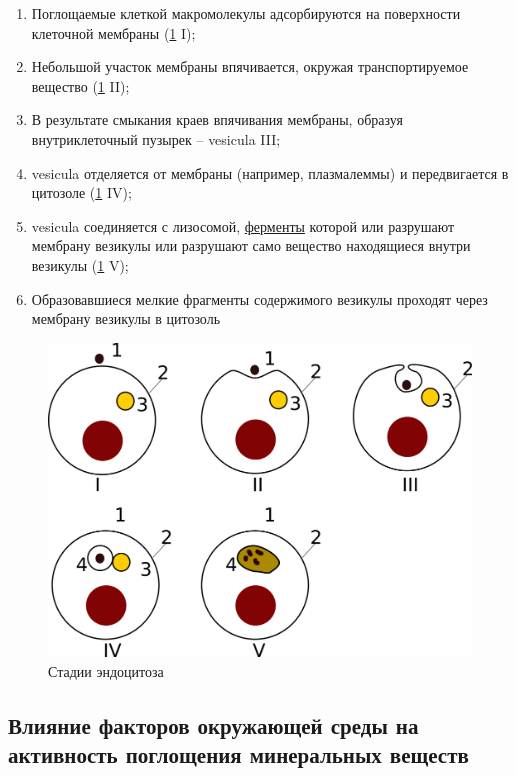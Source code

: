 \begin{enumerate}

	\item Поглощаемые клеткой макромолекулы адсорбируются на поверхности клеточной мембраны (\ris \ref{endocytoze} I);  
	\item Небольшой участок мембраны впячивается, окружая транспортируемое вещество (\ris \ref{endocytoze} II);
	\item В результате смыкания краев впячивания мембраны, образуя внутриклеточный пузырек -- \gls{vesicula} III;
	\item \gls{vesicula} отделяется от мембраны (например, плазмалеммы) и передвигается в цитозоле (\ris \ref{endocytoze} IV); 
	\item \gls{vesicula} соединяется с лизосомой, \hyperlink{enzimes}{ферменты} которой или разрушают мембрану везикулы или разрушают само вещество находящиеся внутри везикулы (\ris \ref{endocytoze} V); 
	\item Образовавшиеся мелкие фрагменты содержимого везикулы проходят через мембрану везикулы в цитозоль

\end{enumerate}

\begin{figure}[h!]
  \centering
       \includegraphics[width=0.7\linewidth]{pictures/endocytoze}
\caption{Стадии эндоцитоза}
\label{endocytoze}
\end{figure}

\subsection*{Влияние факторов окружающей среды на активность поглощения минеральных веществ}

